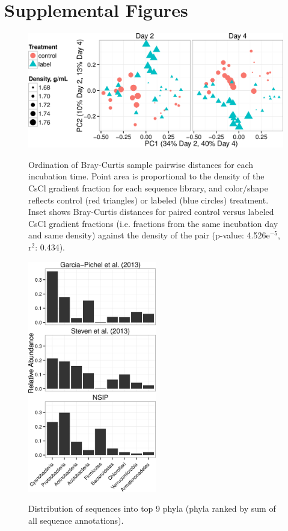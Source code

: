 \section{Supplemental Figures}
\newpage

\begin{figure}[H]
  \centering
  \caption{Ordination of Bray-Curtis sample pairwise distances for each incubation time. Point area is proportional to the density of the CsCl gradient fraction for each sequence library, and color/shape reflects control (red triangles) or labeled (blue circles) treatment. Inset shows Bray-Curtis distances for paired control versus labeled CsCl gradient fractions (i.e. fractions from the same incubation day and same density) against the density of the pair (p-value: 4.526e$^{-5}$, r$^{2}$: 0.434).}
  \includegraphics[width=1.0\textwidth]{figures/ordination_all_day_facet/ordination_all_day_facet.png}
  \label{fig:ordination}
\end{figure}

\begin{figure}[H]
  \centering
  \caption{Distribution of sequences into top 9 phyla (phyla ranked by sum of all sequence annotations).}
    \includegraphics[width=0.5\textwidth]{figures/study_phylum_dist/study_phylum_dist.png}
  \label{fig:study_phy_dist}
\end{figure}

